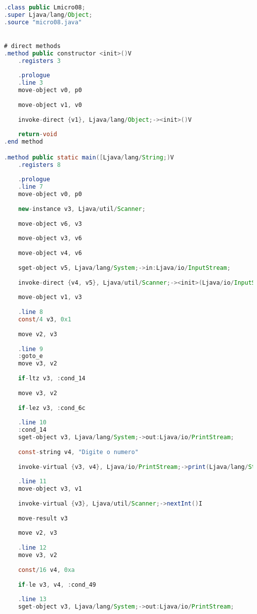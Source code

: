 \documentclass[hidelinks,12pt]{article}
\begin{document}
	\begin{lstlisting}[caption=Smali resultante do .java,language=java]
.class public Lmicro08;
.super Ljava/lang/Object;
.source "micro08.java"


# direct methods
.method public constructor <init>()V
	.registers 3
	
	.prologue
	.line 3
	move-object v0, p0
	
	move-object v1, v0
	
	invoke-direct {v1}, Ljava/lang/Object;-><init>()V
	
	return-void
.end method

.method public static main([Ljava/lang/String;)V
	.registers 8
	
	.prologue
	.line 7
	move-object v0, p0
	
	new-instance v3, Ljava/util/Scanner;
	
	move-object v6, v3
	
	move-object v3, v6
	
	move-object v4, v6
	
	sget-object v5, Ljava/lang/System;->in:Ljava/io/InputStream;
	
	invoke-direct {v4, v5}, Ljava/util/Scanner;-><init>(Ljava/io/InputStream;)V
	
	move-object v1, v3
	
	.line 8
	const/4 v3, 0x1
	
	move v2, v3
	
	.line 9
	:goto_e
	move v3, v2
	
	if-ltz v3, :cond_14
	
	move v3, v2
	
	if-lez v3, :cond_6c
	
	.line 10
	:cond_14
	sget-object v3, Ljava/lang/System;->out:Ljava/io/PrintStream;
	
	const-string v4, "Digite o numero"
	
	invoke-virtual {v3, v4}, Ljava/io/PrintStream;->print(Ljava/lang/String;)V
	
	.line 11
	move-object v3, v1
	
	invoke-virtual {v3}, Ljava/util/Scanner;->nextInt()I
	
	move-result v3
	
	move v2, v3
	
	.line 12
	move v3, v2
	
	const/16 v4, 0xa
	
	if-le v3, v4, :cond_49
	
	.line 13
	sget-object v3, Ljava/lang/System;->out:Ljava/io/PrintStream;
	

\end{lstlisting}
\end{document}
